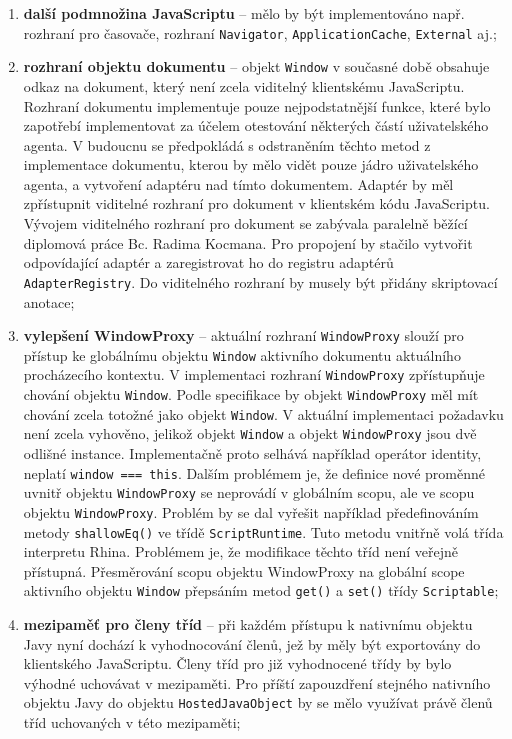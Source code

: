 \begin{enumerate}
  \item \textbf{další podmnožina JavaScriptu} -- mělo by být implementováno např. rozhraní pro časovače, rozhraní \texttt{Navigator}, \texttt{ApplicationCache}, \texttt{External} aj.;
  \item \textbf{rozhraní objektu dokumentu} -- objekt \texttt{Window} v současné době obsahuje odkaz na dokument, který není zcela viditelný klientskému JavaScriptu. Rozhraní dokumentu implementuje pouze nejpodstatnější funkce, které bylo zapotřebí implementovat za účelem otestování některých částí uživatelského agenta. V budoucnu se předpokládá s odstraněním těchto metod z implementace dokumentu, kterou by mělo vidět pouze jádro uživatelského agenta, a vytvoření adaptéru nad tímto dokumentem. Adaptér by měl zpřístupnit viditelné rozhraní pro dokument v klientském kódu JavaScriptu. Vývojem viditelného rozhraní pro dokument se zabývala paralelně běžící diplomová práce Bc. Radima Kocmana. Pro propojení by stačilo vytvořit odpovídající adaptér a zaregistrovat ho do registru adaptérů \texttt{AdapterRegistry}. Do viditelného rozhraní by musely být přidány skriptovací anotace;
  \item \textbf{vylepšení WindowProxy} -- aktuální rozhraní \texttt{WindowProxy} slouží pro přístup ke globálnímu objektu \texttt{Window} aktivního dokumentu aktuálního procházecího kontextu. V implementaci rozhraní \texttt{WindowProxy} zpřístupňuje chování objektu \texttt{Window}. Podle specifikace by objekt \texttt{WindowProxy} měl mít chování zcela totožné jako objekt \texttt{Window}. V aktuální implementaci požadavku není zcela vyhověno, jelikož objekt \texttt{Window} a objekt \texttt{WindowProxy} jsou dvě odlišné instance. Implementačně proto selhává například operátor identity, neplatí \texttt{window === this}. Dalším problémem je, že definice nové proměnné uvnitř objektu \texttt{WindowProxy} se neprovádí v globálním scopu, ale ve scopu objektu \texttt{WindowProxy}. Problém by se dal vyřešit například předefinováním metody \texttt{shallowEq()} ve třídě \texttt{ScriptRuntime}. Tuto metodu vnitřně volá třída interpretu Rhina. Problémem je, že modifikace těchto tříd není veřejně přístupná. Přesměrování scopu objektu WindowProxy na globální scope aktivního objektu \texttt{Window} přepsáním metod \texttt{get()} a \texttt{set()} třídy \texttt{Scriptable};
  \item \textbf{mezipaměť pro členy tříd} -- při každém přístupu k nativnímu objektu Javy nyní dochází k vyhodnocování členů, jež by měly být exportovány do klientského JavaScriptu. Členy tříd pro již vyhodnocené třídy by bylo výhodné uchovávat v mezipaměti. Pro příští zapouzdření stejného nativního objektu Javy do objektu \texttt{HostedJavaObject} by se mělo využívat právě členů tříd uchovaných v této mezipaměti;

\end{enumerate}
